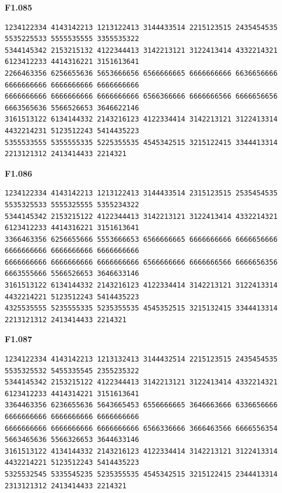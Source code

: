 \noindent\begin{minipage}{\linewidth}\textbf{F1.085}
\begin{lstlisting}
1234122334 4143142213 1213122413 3144433514 2215123515 2435454535 5535225533 5555535555 3355535322
5344145342 2153215132 4122344413 3142213121 3122413414 4332214321 6123412233 4414316221 3151613641
2266463356 6256655636 5653666656 6566666665 6666666666 6636656666 6666666666 6666666666 6666666666
6666666666 6666666666 6666666666 6566366666 6666666566 6666656656 6663565636 5566526653 3646622146
3161513122 6134144332 2143216123 4122334414 3142213121 3122413314 4432214231 5123512243 5414435223
5355533555 5355555335 5225355535 4545342515 3215122415 3344413314 2213121312 2413414433 2214321
\end{lstlisting}
\end{minipage}\par\smallskip

\noindent\begin{minipage}{\linewidth}\textbf{F1.086}
\begin{lstlisting}
1234122334 4143142213 1213122413 3144433514 2315123515 2535454535 5535325533 5555325555 5355234322
5344145342 2153215122 4122344413 3142213121 3122413414 4332214321 6123412233 4414316221 3151613641
3366463356 6256655666 5553666653 6566666665 6666666666 6666656666 6666666666 6666666666 6666666666
6666666666 6666666666 6666666666 6566666666 6666666566 6666656356 6663555666 5566526653 3646633146
3161513122 6134144332 2143216123 4122334414 3142213121 3122413314 4432214221 5123512243 5414435223
4325535555 5235555335 5235355535 4545352515 3215132415 3344413314 2213121312 2413414433 2214321
\end{lstlisting}
\end{minipage}\par\smallskip

\noindent\begin{minipage}{\linewidth}\textbf{F1.087}
\begin{lstlisting}
1234122334 4143142213 1213132413 3144432514 2215123515 2435454535 5535325532 5455335545 2355235322
5344145342 2153215122 4122344413 3142213121 3122413414 4332214321 6123412233 4414314221 3151613641
3364463356 6236655636 5643665453 6556666665 3646663666 6336656666 6666666666 6666666666 6666666666
6666666666 6666666666 6666666666 6566336666 3666463566 6666556354 5663465636 5566326653 3644633146
3161513122 4134144332 2143216123 4122334414 3142213121 3122413314 4432214221 5123512243 5414435223
5325532545 5335545235 5235355535 4545342515 3215122415 2344413314 2313121312 2413414433 2214321
\end{lstlisting}
\end{minipage}\par\smallskip

